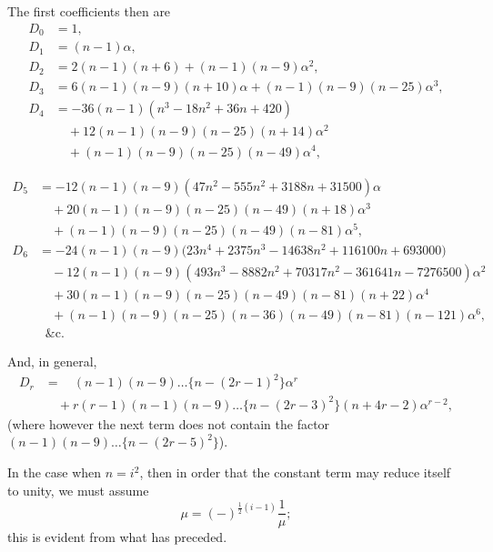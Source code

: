 \documentclass[11pt]{article}
\begin{document}
The first coefficients then are
\begin{align*}
D_{0} &= 1,\\
D_{1} &= (n - 1)\alpha,\\
D_{2} &= 2 (n - 1)(n + 6) + (n - 1)(n - 9)\alpha^{2},\\
D_{3} &= 6 (n - 1)(n - 9)(n + 10)\alpha + (n - 1)(n - 9)(n - 25)\alpha^{3},\\
D_{4} &= -36 (n - 1)(n^{3} - 18 n^{2} + 36 n + 420)\\
      &\quad + 12 (n - 1)(n - 9)(n - 25)(n + 14)\alpha^{2}\\
      &\quad + (n - 1)(n - 9)(n - 25)(n - 49)\alpha^{4},
\end{align*}

\bigskip

\noindent
\begin{align*}
D_{5} &= -12 (n - 1)(n - 9)(47 n^{2} - 555 n^{2} + 3188 n + 31500)\alpha\\
      &\quad + 20 (n - 1)(n - 9)(n - 25)(n - 49)(n + 18)\alpha^{3}\\
      &\quad + (n - 1)(n - 9)(n - 25)(n - 49)(n - 81)\alpha^{5},\\
D_{6} &= -24 (n - 1)(n - 9)\bigl(23 n^{4} + 2375 n^{3} - 14638 n^{2} + 116100 n + 693000\bigr)\\
      &\quad - 12 (n - 1)(n - 9)(493 n^{3} - 8882 n^{2} + 70317 n^{2} - 361641 n - 7276500)\alpha^{2}\\
      &\quad + 30 (n - 1)(n - 9)(n - 25)(n - 49)(n - 81)(n + 22)\alpha^{4}\\
      &\quad + (n - 1)(n - 9)(n - 25)(n - 36)(n - 49)(n - 81)(n - 121)\alpha^{6},\\
      &\;\;\&\text{c.}
\end{align*}

And, in general,
\begin{align*}
D_{r} &= \phantom{+\,} (n - 1)(n - 9)\ldots\{n - (2 r - 1)^{2}\}\alpha^{r}\\
      &\quad + r(r - 1)(n - 1)(n - 9)\ldots\{n - (2 r - 3)^{2}\}(n + 4 r - 2)\alpha^{r - 2},
\end{align*}
(where however the next term does not contain the factor $(n - 1)(n - 9)\ldots\{n - (2 r - 5)^{2}\}$).

\medskip
In the case when $n = i^{2}$, then in order that the constant term may reduce itself
to unity, we must assume
\[
\mu = (-)^{\frac{1}{2}(i - 1)}\frac{1}{\mu};
\]
this is evident from what has preceded.
\end{document}
